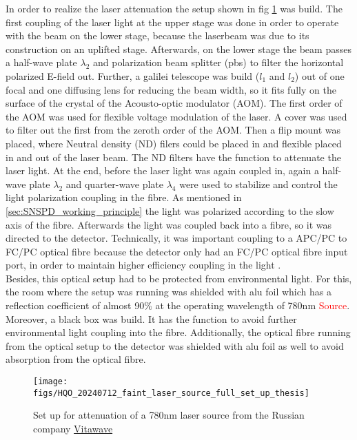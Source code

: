 In order to realize the laser attenuation the setup shown in fig \ref{fig: faint_laser_source_full_set_up} was build.
The first coupling of the laser light at the upper stage was done in order to operate with the beam on the lower stage, because the laserbeam
was due to its construction on an uplifted stage. 
Afterwards, on the lower stage the beam passes a half-wave plate $\lambda_2$ and polarization beam splitter (pbs) to filter the horizontal
polarized E-field out.
Further, a galilei telescope was build ($l_1$ and $l_2$) out of one focal and one diffusing lens for reducing the beam width, so it fits fully
on the surface of the crystal of the Acousto-optic modulator (AOM).
The first order of the AOM was used for flexible voltage modulation of the laser.
A cover was used to filter out the first from the zeroth order of the AOM.
Then a flip mount was placed, where Neutral density (ND) filers could be placed in and flexible placed in and out of the laser beam.
The ND filters have the function to attenuate the laser light. 
At the end, before the laser light was again coupled in, again a half-wave plate $\lambda_2$ and quarter-wave plate $\lambda_4$ were used to
stabilize and control the light polarization coupling in the fibre.
As mentioned in \ref{sec:SNSPD_working_principle} the light was polarized according to the slow axis of the fibre.
Afterwards the light was coupled back into a fibre, so it was directed to the detector.
Technically, it was important coupling to a APC/PC to FC/PC optical fibre because the detector only had
an FC/PC optical fibre input port, in order to maintain higher efficiency coupling in the light \cite{single_quantum_scspcm}.\\

Besides, this optical setup had to be protected from environmental light.
For this, the room where the setup was running was shielded
with alu foil which has a reflection coefficient of almost 90$\%$ at the operating wavelength of 780nm \textcolor{red}{Source}.
Moreover, a black box was build.
It has the function to avoid further environmental light coupling into the fibre.
Additionally, the optical fibre running from the optical setup to the detector was shielded with alu foil as well to
avoid absorption from the optical fibre. \\

\begin{figure}
    \centering
    \texttt{[image: figs/HQO\_20240712\_faint\_laser\_source\_full\_set\_up\_thesis]}
    \caption{Set up for attenuation of a 780nm laser source from the Russian company \href{http://vitawave.ru/eng/}{Vitawave}}
    \label{fig: faint_laser_source_full_set_up}
\end{figure}


